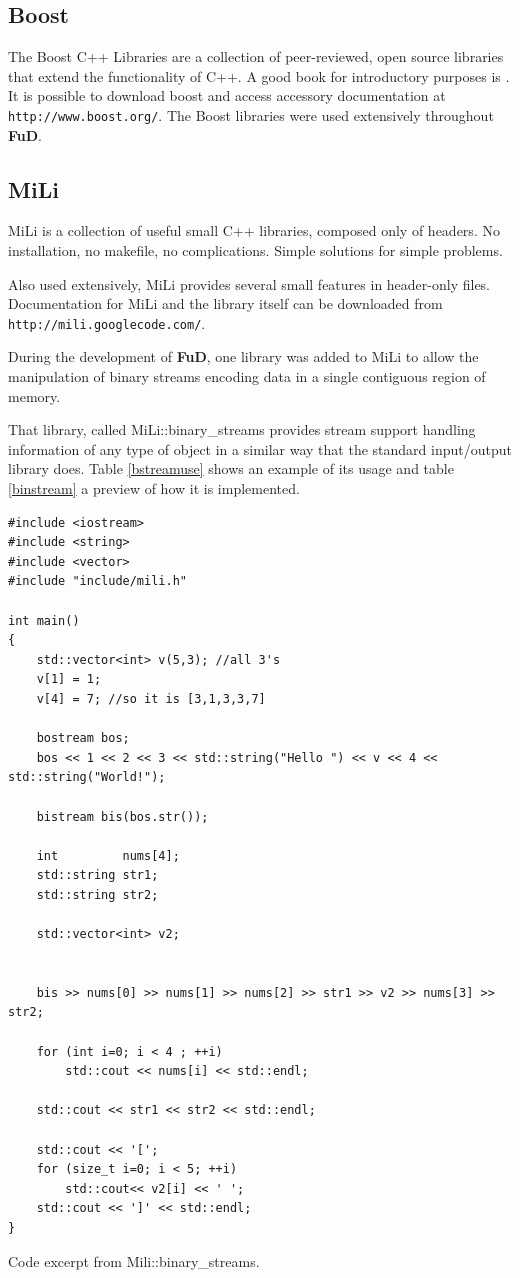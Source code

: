 \documentclass[a4paper,12pt,english]{report}
\newcommand{\fud}{\textbf{FuD}}
\begin{document}
\subsection{Boost}

The Boost C++ Libraries are a collection of peer-reviewed, open source libraries that extend the functionality of C++. A good book for introductory purposes is \cite{boost}. It is possible to download boost and access accessory documentation at \texttt{http://www.boost.org/}. The Boost libraries were used extensively throughout \fud. 

\subsection{MiLi}

MiLi is a collection of useful small C++ libraries, composed only of headers. No installation, no makefile, no complications. Simple solutions for simple problems.

Also used extensively, MiLi provides several small features in header-only files. Documentation for MiLi and the library itself can be downloaded from \texttt{http://mili.googlecode.com/}.

During the development of \fud, one library was added to MiLi to allow the manipulation of binary streams encoding data in a single contiguous region of memory. 

That library, called MiLi::binary\_streams provides stream support handling information of any type of object  in a similar way that the standard input/output library does. Table \ref{bstreamuse} shows an example of its usage and table \ref{binstream} a preview of how it is implemented.

\begin{table}[!htb]
\lstset{language=C++}
\begin{lstlisting}[frame=single]
#include <iostream>
#include <string>
#include <vector>
#include "include/mili.h"

int main()
{
    std::vector<int> v(5,3); //all 3's
    v[1] = 1;
    v[4] = 7; //so it is [3,1,3,3,7]

    bostream bos;
    bos << 1 << 2 << 3 << std::string("Hello ") << v << 4 << std::string("World!");

    bistream bis(bos.str());

    int         nums[4];
    std::string str1;
    std::string str2;

    std::vector<int> v2;


    bis >> nums[0] >> nums[1] >> nums[2] >> str1 >> v2 >> nums[3] >> str2;

    for (int i=0; i < 4 ; ++i)
        std::cout << nums[i] << std::endl;

    std::cout << str1 << str2 << std::endl;

    std::cout << '[';
    for (size_t i=0; i < 5; ++i)
        std::cout<< v2[i] << ' ';
    std::cout << ']' << std::endl;
}
\end{lstlisting}
\centering \caption{Code excerpt from Mili::binary\_streams.} 
\label{bstreamuse}
\end{table}
\end{document}
